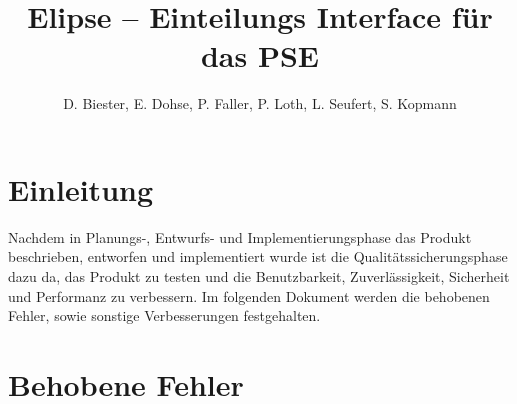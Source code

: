 \documentclass[parskip=full]{scrartcl}
\begin{document}
\title{Elipse -- Einteilungs Interface für das PSE}
\author{D. Biester, E. Dohse, P. Faller, P. Loth, L. Seufert, S. Kopmann}
\zweitgutachter{}
\mytitlepage
{\setlength{\textheight}{297mm}
\tableofcontents

\setlength{\textheight}{297mm}}
\pagebreak

\section{Einleitung}
Nachdem in Planungs-, Entwurfs- und Implementierungsphase das Produkt
beschrieben, entworfen und implementiert wurde ist die Qualitätssicherungsphase
dazu da, das Produkt zu testen und die Benutzbarkeit, Zuverlässigkeit, 
Sicherheit und Performanz zu verbessern. Im folgenden Dokument werden die
behobenen Fehler, sowie sonstige Verbesserungen festgehalten.

\section{Behobene Fehler}
\end{document}
